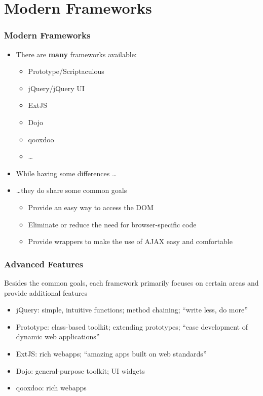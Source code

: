 \documentclass{beamer}
\begin{document}
\section{Modern Frameworks}
\begin{frame}
  \frametitle{Modern Frameworks}
  \begin{itemize}
    \item There are \textbf{many} frameworks available:
    \begin{itemize}
      \item Prototype/Scriptaculous
      \item jQuery/jQuery UI
      \item ExtJS
      \item Dojo
      \item qooxdoo
      \item \ldots
    \end{itemize}
    \item While having some differences \ldots
    \item \ldots they do share some common goals
    \begin{itemize}
      \item Provide an easy way to access the DOM
      \item Eliminate or reduce the need for browser-specific code
      \item Provide wrappers to make the use of AJAX easy and comfortable
    \end{itemize}
  \end{itemize}
\end{frame}

\begin{frame}
  \frametitle{Advanced Features}
  Besides the common goals, each framework primarily focuses on certain areas and provide additional
  features
  \begin{itemize}
    \item jQuery: simple, intuitive functions; method chaining; \enquote{write less, do more}
    \item Prototype: class-based toolkit; extending prototypes; \enquote{ease development of
      dynamic web applications}
    \item ExtJS: rich webapps; \enquote{amazing apps built on web standards}
    \item Dojo: general-purpose toolkit; UI widgets
    \item qooxdoo: rich webapps
  \end{itemize}
\end{frame}
\end{document}

